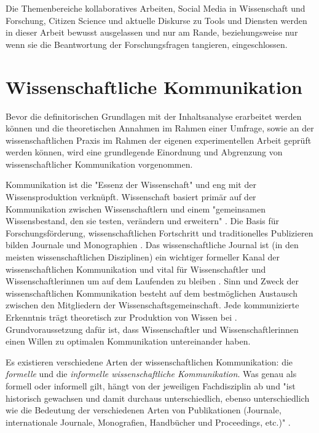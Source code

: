 Die Themenbereiche kollaboratives Arbeiten, Social Media in Wissenschaft und Forschung, Citizen Science und aktuelle Diskurse zu Tools und Diensten werden in dieser Arbeit bewusst ausgelassen und nur am Rande, beziehungsweise nur wenn sie die Beantwortung der Forschungsfragen tangieren, eingeschlossen.

\section{Wissenschaftliche Kommunikation}
Bevor die definitorischen Grundlagen mit der Inhaltsanalyse erarbeitet werden können und die theoretischen Annahmen im Rahmen einer Umfrage, sowie an der wissenschaftlichen Praxis im Rahmen der eigenen experimentellen Arbeit geprüft werden können, wird eine grundlegende Einordnung und Abgrenzung von wissenschaftlicher Kommunikation vorgenommen.

Kommunikation ist die "Essenz der Wissenschaft" \cite{garvey_2014_communication} und eng mit der Wissensproduktion verknüpft. Wissenschaft basiert primär auf der Kommunikation zwischen Wissenschaftlern und einem "gemeinsamen Wissensbestand, den sie testen, verändern und erweitern" \cite{Gl_ser_2007}. Die Basis für Forschungsförderung, wissenschaftlichen Fortschritt und traditionelles Publizieren bilden Journale und Monographien \cite{cope2014future}. Das wissenschaftliche Journal ist (in den meisten wissenschaftlichen Disziplinen) ein wichtiger formeller Kanal der wissenschaftlichen Kommunikation und vital für Wissenschaftler und Wissenschaftlerinnen um auf dem Laufenden zu bleiben \cite{cope2014future}. Sinn und Zweck der wissenschaftlichen Kommunikation besteht auf dem bestmöglichen Austausch zwischen den Mitgliedern der Wissenschaftsgemeinschaft. Jede kommunizierte Erkenntnis trägt theoretisch zur Produktion von Wissen bei \cite{kaden_2009_library}. Grundvoraussetzung dafür ist, dass Wissenschaftler und Wissenschaftlerinnen einen Willen zu optimalen Kommunikation untereinander haben.

Es existieren verschiedene Arten der wissenschaftlichen Kommunikation: die \textit{formelle} und die \textit{informelle wissenschaftliche Kommunikation}. Was genau als formell oder informell gilt, hängt von der jeweiligen Fachdisziplin ab und "ist historisch gewachsen und damit durchaus unterschiedlich, ebenso unterschiedlich wie die Bedeutung der verschiedenen Arten von Publikationen (Journale, internationale Journale, Monografien, Handbücher und Proceedings, etc.)" \cite{Hanekop_2014}.

